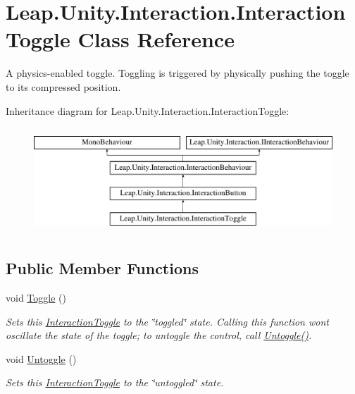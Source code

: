 \hypertarget{class_leap_1_1_unity_1_1_interaction_1_1_interaction_toggle}{}\section{Leap.\+Unity.\+Interaction.\+Interaction\+Toggle Class Reference}
\label{class_leap_1_1_unity_1_1_interaction_1_1_interaction_toggle}


A physics-\/enabled toggle. Toggling is triggered by physically pushing the toggle to its compressed position.  


Inheritance diagram for Leap.\+Unity.\+Interaction.\+Interaction\+Toggle\+:\begin{figure}[H]
\begin{center}
\leavevmode
\includegraphics[height=4.000000cm]{class_leap_1_1_unity_1_1_interaction_1_1_interaction_toggle}
\end{center}
\end{figure}
\subsection*{Public Member Functions}
\begin{DoxyCompactItemize}
\item 
void \mbox{\hyperlink{class_leap_1_1_unity_1_1_interaction_1_1_interaction_toggle_a8f7718af1921acdf098f92cea3ec496f}{Toggle}} ()
\begin{DoxyCompactList}\small\item\em Sets this \mbox{\hyperlink{class_leap_1_1_unity_1_1_interaction_1_1_interaction_toggle}{Interaction\+Toggle}} to the \char`\"{}toggled\char`\"{} state. Calling this function won\textquotesingle{}t oscillate the state of the toggle; to \textquotesingle{}untoggle\textquotesingle{} the control, call \mbox{\hyperlink{class_leap_1_1_unity_1_1_interaction_1_1_interaction_toggle_a86710d731160a015986142cfe47e01e0}{Untoggle()}}. \end{DoxyCompactList}\item 
void \mbox{\hyperlink{class_leap_1_1_unity_1_1_interaction_1_1_interaction_toggle_a86710d731160a015986142cfe47e01e0}{Untoggle}} ()
\begin{DoxyCompactList}\small\item\em Sets this \mbox{\hyperlink{class_leap_1_1_unity_1_1_interaction_1_1_interaction_toggle}{Interaction\+Toggle}} to the \char`\"{}untoggled\char`\"{} state. \end{DoxyCompactList}\end{DoxyCompactItemize}
